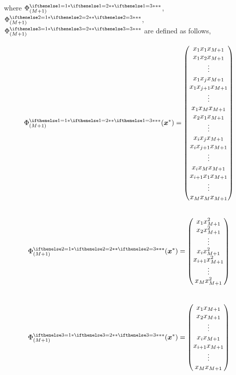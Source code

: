 \documentclass[11pt,a4paper]{article}
\newcommand{\htab}{\hspace*{0.63cm}}
\begin{document}
\htab where $\PhiMMs{1}$, $\PhiMMs{2}$, $\PhiMMs{3}$ are defined as follows,
\begin{multicols}{2}
    \begin{align}
    \PhiMMs{1}(\xxp) = \begin{pmatrix} 
              x_{1} x_{1} x_{M+1}  \\   x_{1}x_{2} x_{M+1}  \\ \vdots \\ 
              x_{1} x_{j} x_{M+1}  \\   x_{1}x_{j+1} x_{M+1}  \\ \vdots \\ 
              x_{1} x_{M} x_{M+1}  \\   x_{2}x_{1} x_{M+1}  \\ \vdots \\ 
              x_{i} x_{j} x_{M+1}  \\   x_{i}x_{j+1} x_{M+1}  \\ \vdots \\ 
              x_{i} x_{M} x_{M+1}  \\   x_{i+1}x_{1} x_{M+1}  \\ \vdots \\ 
              x_{M} x_{M} x_{M+1}
        \end{pmatrix} 
    \end{align}
    \begin{align} \nonumber \\
    \PhiMMs{2} (\xxp)= 
        \begin{pmatrix} 
              x_{1} x_{M+1}^{2} \\   x_{2} x_{M+1}^{2} \\ \vdots  \\
             x_{i} x_{M+1}^{2} \\  x_{i+1} x_{M+1}^{2} \\ \vdots  \\ 
              x_{M} x_{M+1}^{2} 
        \end{pmatrix} \\[0.8cm]
        \PhiMMs{3}(\xxp) = 
        \begin{pmatrix} 
              x_{1} x_{M+1} \\   x_{2} x_{M+1} \\ \vdots  \\
             x_{i} x_{M+1} \\  x_{i+1} x_{M+1} \\ \vdots  \\ 
              x_{M} x_{M+1} 
        \end{pmatrix}
    \end{align} 
\end{multicols}
\end{document}
